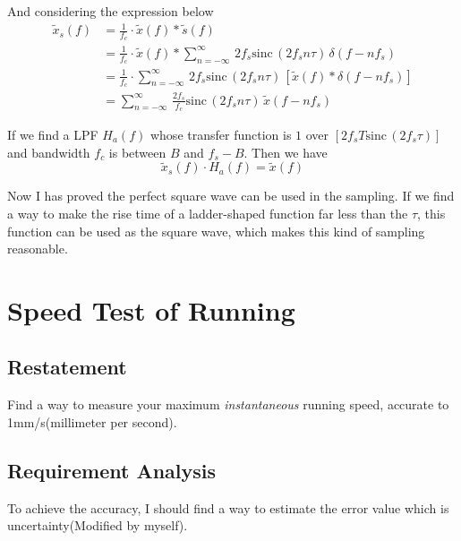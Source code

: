 \documentclass{article}
\begin{document}
And considering the expression below
\begin{equation}
    \begin{aligned}
        \widetilde{x}_s(f) & = \frac{1}{f_c} \cdot \widetilde{x}
         (f) * \widetilde{s}(f)                  \\
                           & = \frac{1}{f_c}\cdot \widetilde{x}(f) * \sum_
                             {n = -\infty}^{\infty}\, 2f_s \mathrm{sinc}\,
                             ( 2f_s n\tau)\, \delta(f - nf_s)  \\
                           & = \frac{1}{f_c} \cdot \sum_{n = -\infty}^
                             {\infty}\, 2f_s \mathrm{sinc}\, ( 2f_s
                             n\tau)\, \left[ \widetilde{x}(f) *\delta
                             (f - nf_s) \right] \\
                           & = \sum_{n = -\infty}^{\infty}\,\frac{2f_s}
                             {f_c} \mathrm{sinc}\, ( 2f_s n\tau)\, \widetilde
                             {x}(f - nf_s)
    \end{aligned}
\end{equation}

If we find a LPF $H_a(f)$ whose transfer function is $1$ over $[2f_s T \mathrm
{sinc}\, ( 2f_s\tau)]$ and bandwidth $f_c$ is between $B$ and $f_s - B$. Then
we have
\begin{equation}
    \widetilde{x}_s(f) \cdot H_a(f) = \widetilde{x}(f)
\end{equation}

Now I has proved the perfect square wave can be used in the sampling. If we
find a way to make the rise time of a ladder-shaped function far less than
the $\tau$, this function can be used as the square wave, which makes this
kind of sampling reasonable.


\section{Speed Test of Running}

\subsection{Restatement} Find a way to measure your maximum \emph
 {instantaneous} running speed, accurate to 1mm/s(millimeter per second).

\subsection{Requirement Analysis}
\label{prepare} To achieve the accuracy, I should find a way to estimate the
 error value which is uncertainty(Modified by myself).
\end{document}
